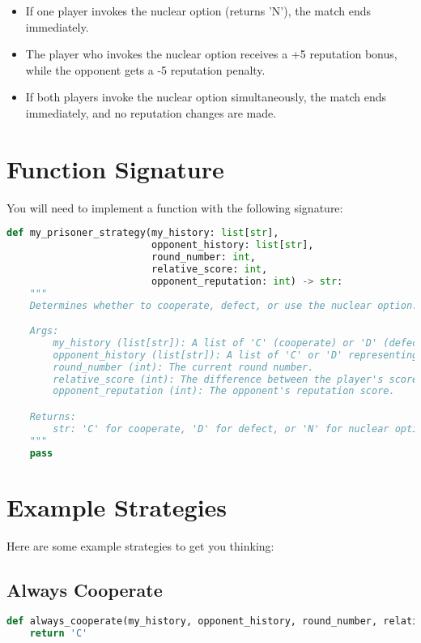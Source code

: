 \documentclass[11pt]{article}
\begin{document}
\begin{itemize}
    \item If one player invokes the nuclear option (returns 'N'), the match ends immediately.
    \item The player who invokes the nuclear option receives a +5 reputation bonus, while the opponent gets a -5 reputation penalty.
    \item If both players invoke the nuclear option simultaneously, the match ends immediately, and no reputation changes are made.
\end{itemize}

\section*{Function Signature}
You will need to implement a function with the following signature:
\begin{lstlisting}[language=Python]
def my_prisoner_strategy(my_history: list[str], 
                         opponent_history: list[str], 
                         round_number: int,
                         relative_score: int,
                         opponent_reputation: int) -> str:
    """
    Determines whether to cooperate, defect, or use the nuclear option.

    Args:
        my_history (list[str]): A list of 'C' (cooperate) or 'D' (defect) representing my past moves.
        opponent_history (list[str]): A list of 'C' or 'D' representing the opponent's past moves.
        round_number (int): The current round number.
        relative_score (int): The difference between the player's score and the opponent's score.
        opponent_reputation (int): The opponent's reputation score.

    Returns:
        str: 'C' for cooperate, 'D' for defect, or 'N' for nuclear option.
    """
    pass
\end{lstlisting}

\section*{Example Strategies}
Here are some example strategies to get you thinking:

\subsection*{Always Cooperate}
\begin{lstlisting}[language=Python]
def always_cooperate(my_history, opponent_history, round_number, relative_score, opponent_reputation):
    return 'C'
\end{lstlisting}
\end{document}
